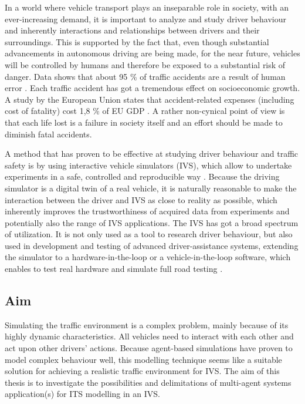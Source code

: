 \documentclass[titlepage, 12pt]{article}
\begin{document}
In a world where vehicle transport plays an inseparable role in society, with an ever-increasing
demand, it is important to analyze and study driver behaviour and inherently interactions and
relationships between drivers and their surroundings. This is supported by the fact that, even though
substantial advancements in autonomous driving are being made, for the near future, vehicles 
will be controlled by humans and therefore be exposed to a substantial risk of danger. 
Data shows that about 95 \% of traffic accidents are a result of human error \cite{Parliament2021}. 
Each traffic accident has got a tremendous effect on socioeconomic growth. A study by the European
Union states that accident-related expenses (including cost of fatality) cost 1,8 \% of EU GDP \cite{Wijnen2017}.  
A rather non-cynical point of view is that each life lost is a failure in society itself and an effort
should be made to diminish fatal accidents.


A method that has proven to be effective at studying driver behaviour and
traffic safety is by using interactive vehicle simulators (IVS), which allow to
undertake experiments in a safe, controlled and reproducible way \cite{Winter2012}.  Because
the driving simulator is a digital twin of a real vehicle, it is naturally
reasonable to make the interaction between the driver and IVS as close to
reality as possible, which inherently improves the trustworthiness of acquired data from experiments
and potentially also the range of IVS applications. The IVS has got a broad
spectrum of utilization. It is not only used as a tool to research driver
behaviour, but also used in development and testing of advanced
driver-assistance systems, extending the simulator to a hardware-in-the-loop or
a vehicle-in-the-loop software, which enables to test real hardware and simulate
full road testing \cite{Horvath2019}.

\subsection{Aim}

Simulating the traffic environment is a complex problem, mainly because of
its highly dynamic characteristics. All vehicles need to interact with
each other and act upon other drivers' actions. Because agent-based simulations
have proven to model complex behaviour well, this modelling technique seems like
a suitable solution for achieving a realistic traffic environment for IVS. The 
aim of this thesis is to investigate the possibilities and delimitations of 
multi-agent systems application(s) for ITS modelling in an IVS. 
\end{document}
